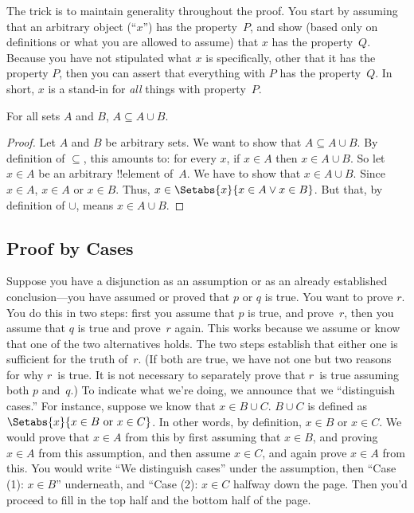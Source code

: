 \documentclass[../../../include/open-logic-section]{subfiles}
\begin{document}
The trick is to maintain generality throughout the proof. You start by
assuming that an arbitrary object (``$x$'') has the property~$P$, and
show (based only on definitions or what you are allowed to assume)
that $x$ has the property~$Q$. Because you have not stipulated what
$x$ is specifically, other that it has the property $P$, then you can
assert that everything with $P$ has the property~$Q$. In short, $x$ is a
stand-in for \emph{all} things with property~$P$.

\begin{prop}
  For all sets $A$ and $B$, $A \subseteq A \cup B$.
\end{prop}

\begin{proof}
  Let $A$ and $B$ be arbitrary sets.  We want to show that $A
  \subseteq A \cup B$. By definition of $\subseteq$, this amounts to:
  for every $x$, if $x \in A$ then $x \in A \cup B$. So let $x \in A$
  be an arbitrary !!{element} of~$A$. We have to show that $x \in A
  \cup B$. Since $x \in A$, $x \in A$ or $x \in B$. Thus, $x \in
  \Setabs{x}{x \in A \lor x \in B}$. But that, by definition of $\cup
  $, means $x \in A \cup B$.
\end{proof}


\subsection{Proof by Cases}

Suppose you have a disjunction as an assumption or as an already
established conclusion---you have assumed or proved that $p$ or $q$ is
true.  You want to prove $r$.  You do this in two steps: first you
assume that $p$ is true, and prove~$r$, then you assume that $q$ is
true and prove~$r$ again.  This works because we assume or know that
one of the two alternatives holds. The two steps establish that either
one is sufficient for the truth of~$r$.  (If both are true, we have
not one but two reasons for why $r$~is true. It is not necessary to
separately prove that $r$~is true assuming both $p$ and~$q$.)  To
indicate what we're doing, we announce that we ``distinguish cases.''
For instance, suppose we know that $x \in B \cup C$.  $B \cup C$ is
defined as $\Setabs{x}{x \in B \text{ or } x \in C}$. In other words,
by definition, $x \in B$ or $x \in C$. We would prove that $x \in A$
from this by first assuming that $x \in B$, and proving $x \in A$ from
this assumption, and then assume $x \in C$, and again prove $x \in A$
from this.  You would write ``We distinguish cases'' under the
assumption, then ``Case (1): $x \in B$'' underneath, and ``Case (2):
$x \in C$ halfway down the page. Then you'd proceed to fill in the top
half and the bottom half of the page.
\end{document}
